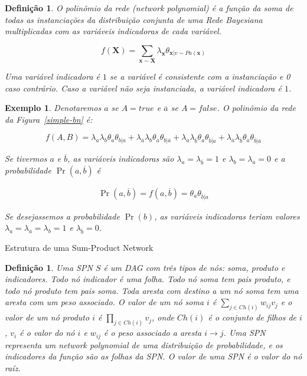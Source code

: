 \documentclass{amsart}
\makeatletter
\def\subsection{\@startsection{subsection}{3}%
  \z@{.5\linespacing\@plus.7\linespacing}{.1\linespacing}%
  {\normalfont\itshape}}
\theoremstyle{plain}
\newcounter{dummy-def}\numberwithin{dummy-def}{subsection}
\newtheorem{definition}[dummy-def]{Definição}
\newcounter{dummy-thm}\numberwithin{dummy-thm}{subsection}
\newcounter{dummy-prop}\numberwithin{dummy-prop}{subsection}
\newcounter{dummy-ex}\numberwithin{dummy-ex}{subsection}
\newcounter{dummy-eg}\numberwithin{dummy-eg}{subsection}
\newtheorem{example}[dummy-eg]{Exemplo}
\numberwithin{equation}{subsection}
\newcommand{\set}[1]{\mathbf{#1}}
\makeatother
\begin{document}
\begin{definition}
  O polinômio da rede (\emph{network polynomial}) é a função da soma de todas as instanciações da
  distribuição conjunta de uma Rede Bayesiana multiplicadas com as variáveis indicadoras de cada
  variável.

  \begin{equation*}
    f(\set{X})=\sum_{\set{x}\sim\set{X}} \lambda_{\set{x}}\theta_{\set{x}|v\sim Pa(\set{x})}
  \end{equation*}

  Uma variável indicadora é $1$ se a variável é consistente com a instanciação e 0 caso contrário.
  Caso a variável não seja instanciada, a variável indicadora é $1$.
\end{definition}

\begin{example}
  Denotaremos $a$ se $A=true$ e $\overline{a}$ se $A=false$. O polinômio da rede da
  Figura~\ref{simple-bn} é:

  \begin{equation*}
    f(A,B)=\lambda_a\lambda_b\theta_a\theta_{b|a}+\lambda_{\overline{a}}\lambda_b
    \theta_{\overline{a}}\theta_{b|\overline{a}}+\lambda_a\lambda_{\overline{b}}\theta_a
    \theta_{\overline{b}|a}+\lambda_{\overline{a}}\lambda_{\overline{b}}
    \theta_{\overline{a}}\theta_{\overline{b}|\overline{a}}
  \end{equation*}

  Se tivermos $a$ e $\overline{b}$, as variáveis indicadoras são $\lambda_a=\lambda_{\overline{b}}=
  1$ e $\lambda_b=\lambda_{\overline{a}}=0$ e a probabilidade $\Pr(a,\overline{b})$ é

  \begin{align*}
    \Pr(a,\overline{b})=f(a,\overline{b})=\theta_a\theta_{\overline{b}|a}
  \end{align*}

  Se desejassemos a probabilidade $\Pr(b)$, as variáveis indicadoras teriam valores $\lambda_a=
  \lambda_{\overline{a}}=\lambda_b=1$ e $\lambda_{\overline{b}}=0$.
\end{example}

\subsection{Estrutura de uma Sum-Product Network}

\begin{definition}
  Uma SPN $S$ é um DAG com três tipos de nós: soma, produto e indicadores. Todo nó indicador é uma
  folha. Todo nó soma tem pais produto, e todo nó produto tem pais soma. Toda aresta com destino a
  um nó soma tem uma aresta com um peso associado. O valor de um nó soma $i$ é $\sum_{j\in Ch(i)}
  w_{ij}v_j$ e o valor de um nó produto $i$ é $\prod_{j\in Ch(i)}v_j$, onde $Ch(i)$ é o conjunto
  de filhos de $i$, $v_i$ é o valor do nó $i$ e $w_{ij}$ é o peso associado a aresta $i\to j$. Uma
  SPN representa um \emph{network polynomial} de uma distribuição de probabilidade, e os
  indicadores da função são as folhas da SPN\@. O valor de uma SPN é o valor do nó raíz.
\end{definition}
\end{document}
